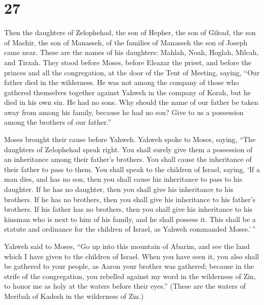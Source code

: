 \hypertarget{section-26}{%
\section{27}\label{section-26}}

 Then the daughters of Zelophehad, the son of Hepher, the
son of Gilead, the son of Machir, the son of Manasseh, of the families
of Manasseh the son of Joseph came near. These are the names of his
daughters: Mahlah, Noah, Hoglah, Milcah, and Tirzah.  They
stood before Moses, before Eleazar the priest, and before the princes
and all the congregation, at the door of the Tent of Meeting, saying,
 ``Our father died in the wilderness. He was not among the
company of those who gathered themselves together against Yahweh in the
company of Korah, but he died in his own sin. He had no sons.
 Why should the name of our father be taken away from
among his family, because he had no son? Give to us a possession among
the brothers of our father.''

 Moses brought their cause before Yahweh. 
Yahweh spoke to Moses, saying,  ``The daughters of
Zelophehad speak right. You shall surely give them a possession of an
inheritance among their father's brothers. You shall cause the
inheritance of their father to pass to them.  You shall
speak to the children of Israel, saying, `If a man dies, and has no son,
then you shall cause his inheritance to pass to his daughter.
 If he has no daughter, then you shall give his
inheritance to his brothers.  If he has no brothers, then
you shall give his inheritance to his father's brothers. 
If his father has no brothers, then you shall give his inheritance to
his kinsman who is next to him of his family, and he shall possess it.
This shall be a statute and ordinance for the children of Israel, as
Yahweh commanded Moses.'\,''

 Yahweh said to Moses, ``Go up into this mountain of
Abarim, and see the land which I have given to the children of Israel.
 When you have seen it, you also shall be gathered to
your people, as Aaron your brother was gathered;  because
in the strife of the congregation, you rebelled against my word in the
wilderness of Zin, to honor me as holy at the waters before their
eyes.'' (These are the waters of Meribah of Kadesh in the wilderness of
Zin.)

